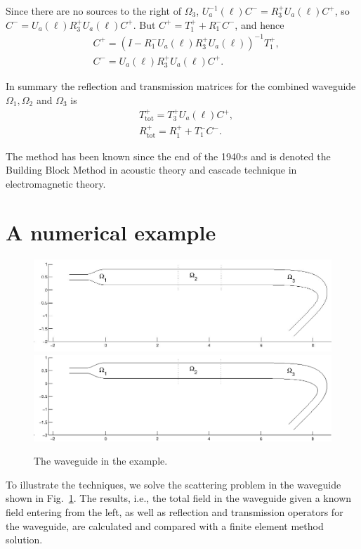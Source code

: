 \documentclass[numreferences]{kluwer}
\newcommand{\Ttot}{T^+_{\text{tot}}}
\newcommand{\Rtot}{R^+_{\text{tot}}}
\begin{document}
Since there are no sources to the right of $\Omega_3$,
$U_a^{-1}(\ell)C^-=R_3^{+}U_a(\ell)C^+$, so
$C^-=U_a(\ell)R_3^{+}U_a(\ell)C^+$. But $C^+=T_1^{+}+R_1^{-}C^-$, and
hence
\begin{equation}
  \label{eq:ABRtotTtot}
  \begin{split}
    &C^+=\left(I-R_1^{-}U_a(\ell)R_3^{+}U_a(\ell)\right)^{-1}T_1^{+},\\
    &C^-=U_a(\ell)R_3^{+}U_a(\ell)C^+.
  \end{split}
\end{equation}

In summary the reflection and transmission matrices for the combined
waveguide $\Omega_1, \Omega_2$ and $\Omega_3$ is
\begin{equation}
  \label{eq:ABRtotTtot2}
  \begin{split}
    &\Ttot=T_3^{+}U_a(\ell)C^+,\\
    &\Rtot=R_1^{+}+T_1^{-}C^-.
  \end{split}
\end{equation}

The method has been known since the end of the 1940:s \cite{kerns1949}
and is denoted the Building Block Method \cite{nilssonbrander1981b} in
acoustic theory and cascade technique \cite{jones1986} in
electromagnetic theory.



\section{A numerical example}
\label{sec:numerical-example}
\begin{figure}[htb]
  \centering \ifpdf
  \includegraphics[width=\textwidth]{waveguide.jpg}
  \else
  \includegraphics[width=\textwidth]{waveguide.eps}
  \fi
  \caption{The waveguide in the example.}
  \label{fig:exwg}
\end{figure}
To illustrate the techniques, we solve the scattering problem
in the waveguide shown in Fig.~\ref{fig:exwg}.
The results, i.e., the total field in the waveguide given a known
field entering from the left, as well as reflection and transmission
operators for the waveguide, are calculated and compared with a finite
element method solution.
\end{document}
